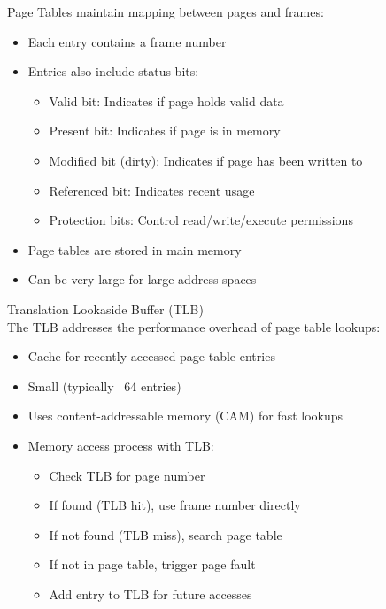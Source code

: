 \begin{definition}{Page Tables} maintain mapping between pages and frames:
    \begin{itemize}
        \item Each entry contains a frame number
        \item Entries also include status bits:
            \begin{itemize}
                \item Valid bit: Indicates if page holds valid data
                \item Present bit: Indicates if page is in memory
                \item Modified bit (dirty): Indicates if page has been written to
                \item Referenced bit: Indicates recent usage
                \item Protection bits: Control read/write/execute permissions
            \end{itemize}
        \item Page tables are stored in main memory
        \item Can be very large for large address spaces
    \end{itemize}
\end{definition}



\begin{definition}{Translation Lookaside Buffer (TLB)}\\
    The TLB addresses the performance overhead of page table lookups:
    \begin{itemize}
        \item Cache for recently accessed page table entries
        \item Small (typically ~64 entries)
        \item Uses content-addressable memory (CAM) for fast lookups
        \item Memory access process with TLB:
            \begin{itemize}
                \item Check TLB for page number
                \item If found (TLB hit), use frame number directly
                \item If not found (TLB miss), search page table
                \item If not in page table, trigger page fault
                \item Add entry to TLB for future accesses
            \end{itemize}
    \end{itemize}
\end{definition}



